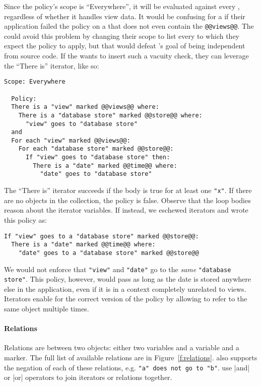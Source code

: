 Since the policy's scope is ``Everywhere'', it will be evaluated against every \controller{},
regardless of whether it handles view data.
%
It would be confusing for a \dev{} if their application failed the policy on a \controller{} 
that does not even contain the \lstinline[language=CNL]|@@views@@|.
%
The \ce{} could avoid this problem by changing their scope to list every \controller{} to which they expect the policy to apply,
but that would defeat \syslang's goal of being independent from source code.
%
If the \ce{} wants to insert such a vacuity check, they can leverage the ``There is'' iterator, like so:
\begin{lstlisting}[language=CNL]
  Scope: Everywhere
  
  Policy:
  There is a "view" marked @@views@@ where:
    There is a "database store" marked @@store@@ where:
      "view" goes to "database store"
  and
  For each "view" marked @@views@@:
    For each "database store" marked @@store@@:
      If "view" goes to "database store" then:
        There is a "date" marked @@time@@ where:
          "date" goes to "database store"
\end{lstlisting}
%
The ``There is'' iterator succeeds if the body is true for at least one \lstinline[language=CNL]|"x"|.
%
If there are no objects in the collection, the policy is false.
%
Observe that the loop bodies reason about the iterator variables.
%
If instead, we eschewed iterators and wrote this policy as:
\begin{lstlisting}[language=CNL]
If "view" goes to a "database store" marked @@store@@:
  There is a "date" marked @@time@@ where:
    "date" goes to a "database store" marked @@store@@
\end{lstlisting}
We would not enforce that \lstinline[language=CNL]|"view"| and \lstinline[language=CNL]|"date"| 
go to the \emph{same} \lstinline[language=CNL]|"database store"|.
%
This policy, however, would pass as long as the date is stored anywhere else in the application,
even if it is in a context completely unrelated to views.
%
Iterators enable for the correct version of the policy by allowing \ces{} to refer to the same object multiple times.

\paragraph{Relations}
%
Relations are between two objects: either two variables and a variable and a marker.
%
The full list of available relations are in Figure~\ref{f:relations}.
%
\syslang{} also supports the negation of each of these relations, e.g. \lstinline[language=CNL]|"a" does not go to "b"|.
%
\Ces{} use |and| or |or| operators to join iterators or relations together.

